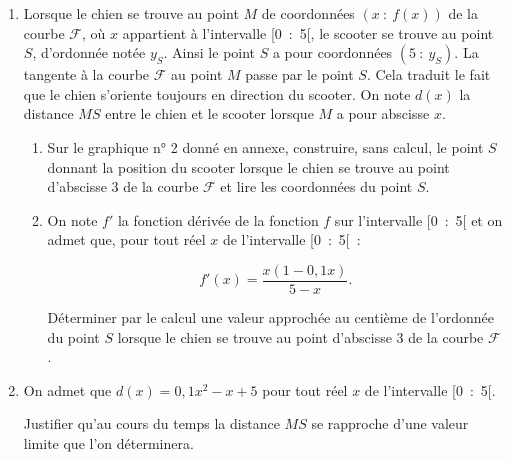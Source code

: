 \begin{enumerate}
     \item Lorsque le chien se trouve au point $M$ de coordonnées $(x~:~f(x))$ de la courbe $\mathscr{F}$, où $x$  appartient à l'intervalle [0~:~5[, le scooter se trouve au point $S$, d'ordonnée notée $y_S$. Ainsi le point $S$
     a pour coordonnées $\left(5~:~y_S\right)$. La tangente à la courbe $\mathscr{F}$ au point $M$ passe par le point $S$. Cela traduit le fait que le chien s'oriente toujours en direction du scooter. On note $d(x)$ la distance $MS$ entre le chien et le scooter lorsque $M$ a pour abscisse $x$.
     \begin{enumerate}[label=\alph*.]
          \item Sur le graphique n° 2 donné en annexe, construire, sans calcul, le point $S$ donnant la position du scooter lorsque le chien se trouve au point d'abscisse 3 de la courbe $\mathscr{F}$ et lire les
          coordonnées du point $S$.
          \item On note $f'$ la fonction dérivée de la fonction $f$ sur l'intervalle [0~:~5[ et on admet que, pour tout réel $x$ de l'intervalle [0~:~5[~:
          \par
          \[f'(x) = \dfrac{x(1  - 0,1x)}{5 - x}.\]
          \par
          Déterminer par le calcul une valeur approchée au centième de l'ordonnée du point $S$ lorsque
          le chien se trouve au point d'abscisse 3 de la courbe $\mathscr{F}$.
     \end{enumerate}
     \item  On admet que $d(x) = 0,1x^2 - x + 5$ pour tout réel $x$ de l'intervalle [0~:~5[.
     \par
     Justifier qu'au cours du temps la distance $MS$ se rapproche d'une valeur limite que l'on déterminera.
\end{enumerate}
\newpage
